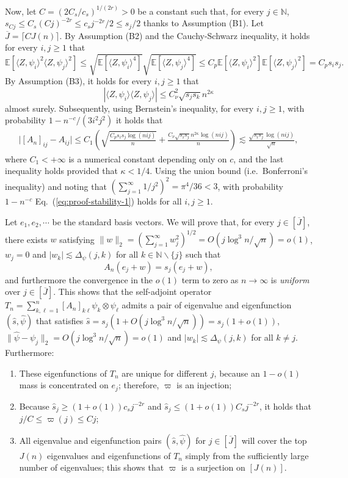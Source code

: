 \documentclass[aos]{imsart}
\renewcommand{\hat}{\widehat}
\renewcommand{\bar}{\overline}
\theoremstyle{plain}
\theoremstyle{definition}
\theoremstyle{definition}
\begin{document}
\begin{appendix}
Now, let $C=(2C_s/c_s)^{1/(2r)}>0$ be a constant such that, for every $j\in\mathbb N$, $s_{Cj}\leq C_s (Cj)^{-2r} \leq c_sj^{-2r}/2\leq s_j/2$ thanks to Assumption (B1). 
Let $\bar J=\lceil CJ(n)\rceil$.
By Assumption (B2) and the Cauchy-Schwarz inequality, it holds for every $i,j\geq 1$ that 
$$
\mathbb E[\langle Z,\psi_i\rangle^2\langle Z,\psi_j\rangle^2] \leq \sqrt{\mathbb E[\langle Z,\psi_i\rangle^4]}\sqrt{\mathbb E[\langle Z,\psi_j\rangle^4]}
\leq C_p\mathbb E[\langle Z,\psi_i\rangle^2]\mathbb E[\langle Z,\psi_j\rangle^2] = C_ps_is_j.
$$
By Assumption (B3), it holds for every $i,j\geq 1$ that 
$$
|\langle Z,\psi_i\rangle\langle Z,\psi_j\rangle| \leq C_\nu^2\sqrt{s_js_k}n^{2\kappa}
$$ almost surely.
Subsequently, using Bernstein's inequality, for every $i,j\geq 1$, with probability $1-n^{-c}/(3i^2j^2)$ it holds that 
\begin{align}
\big|[A_n]_{ij}-A_{ij}\big| \leq C_1\left(\sqrt{\frac{C_ps_is_j\log (nij)}{n}} + \frac{C_\nu\sqrt{s_is_j}n^{2\kappa}\log (nij)}{n}\right) \lesssim \frac{\sqrt{s_is_j}\log(nij)}{\sqrt{n}},
\label{eq:proof-stability-1}
\end{align}
where $C_1<+\infty$ is a numerical constant depending only on $c$, and the last inequality holds provided that $\kappa<1/4$.
Using the union bound (i.e.~Bonferroni's inequality) and noting that $(\sum_{j=1}^{\infty}1/j^2)^2=\pi^4/36<3$, with probability $1-n^{-c}$ Eq.~(\ref{eq:proof-stability-1}) holds for all $i,j\geq 1$.

Let $e_1,e_2,\cdots$ be the standard basis vectors.
We will prove that, for every $j\in[\bar J]$, there exists $w$ satisfying $\|w\|_2 =(\sum_{j=1}^{\infty}w_j^2)^{1/2}= O(j\log^3 n/\sqrt{n})=o(1)$, $w_j=0$ and $|w_k|\lesssim \Delta_\psi(j,k)$ for all $k\in\mathbb N\backslash\{j\}$ such that
\begin{equation}
A_n (e_j+w) = s_j(e_j+w),
\label{eq:eigen-an}
\end{equation}
and furthermore the convergence in the $o(1)$ term to zero as $n\to\infty$ is \emph{uniform} over $j\in[\bar J]$.
This shows that the self-adjoint operator $T_n=\sum_{k,\ell=1}^{n}[A_n]_{k\ell}\psi_k\otimes\psi_\ell$ admits a pair of eigenvalue and eigenfunction $(\hat s,\hat\psi)$ that satisfies
$\hat s=s_j(1+O(j\log^3 n/\sqrt{n}))=s_j(1+o(1))$, $\|\hat\psi-\psi_j\|_2=O(j\log^3 n/\sqrt{n})=o(1)$ and $|w_k|\lesssim \Delta_\psi(j,k)$ for all $k\neq j$. 
Furthermore:
\begin{enumerate}
\item These eigenfunctions of $T_n$ are unique for different $j$, because an $1-o(1)$ mass is concentrated on $e_j$; therefore, $\varpi$ is an injection;
\item Because $\hat s_j \geq (1+o(1))c_s j^{-2r}$ and $\hat s_j\leq (1+o(1))C_s j^{-2r}$, it holds that $j/C\leq \varpi(j)\leq Cj$;
\item All eigenvalue and eigenfunction pairs $(\hat s,\hat\psi)$ for $j\in[\bar J]$ will cover the top $J(n)$ eigenvalues and eigenfunctions of $T_n$ simply from the sufficiently large number of eigenvalues;
this shows that $\varpi$ is a surjection on $[J(n)]$.
\end{enumerate}


\end{appendix}
\end{document}
